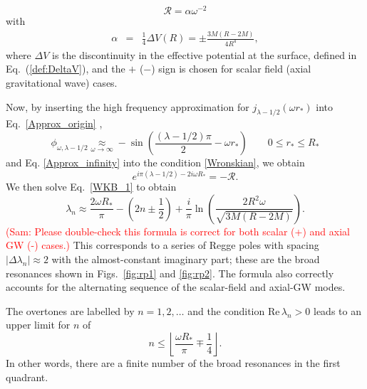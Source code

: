 \documentclass[aps,prd,longbibliography,reprint,twocolumn,amsmath,amssymb,amsfonts,showpacs,superscriptaddress]{revtex4-1}%
\newcommand{\sam}[1]{\textcolor{red}{(Sam: #1)}}
\begin{document}
\begin{equation}\label{R_reflection_1}
  \mathcal{R} = \alpha \omega^{-2}
\end{equation}
with
\begin{eqnarray}
  \alpha &=& \frac{1}{4} \Delta V(R) = \pm \frac{3M(R-2M)}{4 R^4} ,
\end{eqnarray}
where $\Delta V$ is the discontinuity in the effective potential at the surface, defined in Eq.~(\ref{def:DeltaV}), and the $+$ ($-$) sign is chosen for scalar field (axial gravitational wave) cases.

Now, by inserting the high frequency approximation for $j_{\lambda-1/2} (\omega r_*)$ into Eq.~\eqref{Approx_origin} \cite{nist},
\begin{equation}\label{Approx_origin_bis}
  \phi^{}_{\omega,\lambda-1/2} \underset{\omega \to \infty}{\approx} - \sin\left(\frac{\left(\lambda-1/2\right)\pi}{2}-\omega r_*\right)\quad\quad 0\leq r_*\leq R_*
\end{equation}
and Eq. \eqref{Approx_infinity} into the condition  \eqref{Wronskian}, we obtain
\begin{equation}\label{WKB_1}
   e^{ i\pi (\lambda-1/2)- 2 i \omega R_*}=-\mathcal{R}.
\end{equation}
%
We then solve Eq.~\eqref{WKB_1} to obtain
\begin{equation}\label{lambda_Approx}
  \lambda_n \approx \frac{2 \omega R_*}{\pi}-\left(2n \pm \frac{1}{2}\right)+\frac{i}{\pi} \ln\left(\frac{2 R^2 \omega}{\sqrt{3M (R-2M)}}\right) .
\end{equation}
\sam{Please double-check this formula is correct for both scalar (+) and axial GW (-) cases.}
This corresponds to a series of Regge poles with spacing $|\Delta \lambda_n|\approx 2$ with the almost-constant imaginary part; these are the broad resonances shown in Figs.~\ref{fig:rp1} and \ref{fig:rp2}. 
The formula also correctly accounts for the alternating sequence of the scalar-field and axial-GW modes.
 
The overtones are labelled by $n =1,2,\ldots$ and the condition $\text{Re} \, \lambda_n > 0$ leads to an upper limit for $n$ of %
\begin{equation}\label{Limit_Broad_RP}
n \leq \left\lfloor \frac{\omega R_*}{\pi} \mp \frac{1}{4}\right\rfloor.
\end{equation}
%
In other words, there are a finite number of the broad resonances in the first quadrant.
\end{document}

